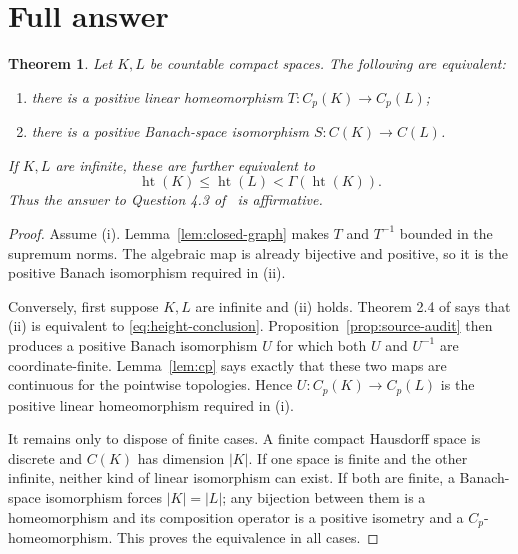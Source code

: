 \documentclass[11pt]{article}
\newtheorem{theorem}{Theorem}
\newcommand{\C}{C}
\newcommand{\Cp}{C_p}
\newcommand{\htop}{\operatorname{ht}}
\begin{document}
\section{Full answer}
\begin{theorem}\label{thm:main}
Let $K,L$ be countable compact spaces.  The following are equivalent:
\begin{enumerate}[label=\textup{(\roman*)}]
\item there is a positive linear homeomorphism
      $T:\Cp(K)\to\Cp(L)$;
\item there is a positive Banach-space isomorphism
      $S:\C(K)\to\C(L)$.
\end{enumerate}
If $K,L$ are infinite, these are further equivalent to
\begin{equation}\label{eq:height-conclusion}
 \htop(K)\leq\htop(L)<\Gamma(\htop(K)).
\end{equation}
Thus the answer to Question 4.3 of~\cite{CHRS} is affirmative.
\end{theorem}

\begin{proof}
Assume (i).  Lemma~\ref{lem:closed-graph} makes $T$ and $T^{-1}$ bounded in
the supremum norms.  The algebraic map is already bijective and positive, so
it is the positive Banach isomorphism required in (ii).

Conversely, first suppose $K,L$ are infinite and (ii) holds.  Theorem 2.4 of
\cite{CHRS} says that (ii) is equivalent to
\eqref{eq:height-conclusion}.  Proposition~\ref{prop:source-audit} then
produces a positive Banach isomorphism $U$ for which both $U$ and $U^{-1}$
are coordinate-finite.  Lemma~\ref{lem:cp} says exactly that these two maps
are continuous for the pointwise topologies.  Hence $U:\Cp(K)\to\Cp(L)$ is
the positive linear homeomorphism required in (i).

It remains only to dispose of finite cases.  A finite compact Hausdorff space
is discrete and $\C(K)$ has dimension $|K|$.  If one space is finite and the
other infinite, neither kind of linear isomorphism can exist.  If both are
finite, a Banach-space isomorphism forces $|K|=|L|$; any bijection between
them is a homeomorphism and its composition operator is a positive isometry
and a $C_p$-homeomorphism.  This proves the equivalence in all cases.
\end{proof}
\end{document}
